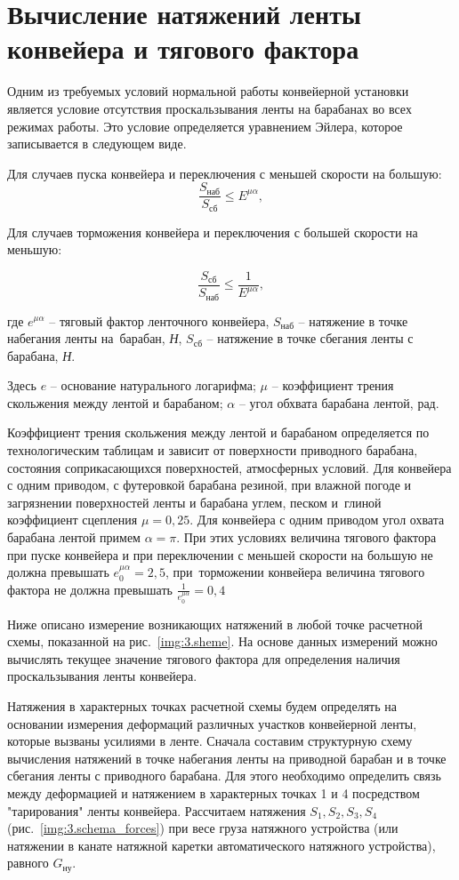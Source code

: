 \section{Вычисление натяжений ленты конвейера и тягового фактора} \label{sect3_4}
Одним из требуемых условий нормальной работы конвейерной установки является условие отсутствия проскальзывания ленты на барабанах во всех режимах работы. Это условие определяется уравнением Эйлера, которое записывается в следующем виде.

Для случаев пуска конвейера и переключения с меньшей скорости на большую:
$$ \frac{S_{\text{наб}}}{S_{\text{сб}}} \leqslant E^{\mu \alpha}, $$

Для случаев торможения конвейера и переключения с большей скорости на меньшую:

$$ \frac{S_{\text{сб}}}{S_{\text{наб}}} \leqslant \frac{1}{E^{\mu \alpha}}, $$

где $ e^{\mu \alpha} $ -- тяговый фактор ленточного конвейера, $ S_{\text{наб}} $ -- натяжение в точке набегания ленты на~барабан, \textit{Н}, $ S_{\text{сб}} $ -- натяжение в точке сбегания ленты с барабана, \textit{Н}.

Здесь $ e $ -- основание натурального логарифма;
      $ \mu $  -- коэффициент трения скольжения между лентой и барабаном;
      $ \alpha $ -- угол обхвата барабана лентой, рад.
      
Коэффициент трения скольжения между лентой и барабаном определяется по технологическим таблицам \cite{lshakhmeyster} и зависит от поверхности приводного барабана, состояния соприкасающихся поверхностей, атмосферных условий. Для конвейера с одним приводом, с футеровкой барабана резиной, при влажной погоде и загрязнении поверхностей ленты и барабана углем, песком и~глиной коэффициент сцепления $ \mu = 0,25 $. Для конвейера с одним приводом угол охвата барабана лентой примем $ \alpha = \pi $. При этих условиях величина тягового фактора при пуске конвейера и при переключении с меньшей скорости на большую не должна превышать $ e_0^{\mu \alpha} = 2,5 $, при~торможении конвейера величина тягового фактора не должна превышать $ \frac{1}{e_0^{\mu \alpha}} = 0,4 $

Ниже описано измерение возникающих натяжений в любой точке расчетной схемы, показанной на рис.~\ref{img:3.sheme}. На основе данных измерений можно вычислять текущее значение тягового фактора для определения наличия проскальзывания ленты конвейера.

Натяжения в характерных точках расчетной схемы будем определять на основании измерения деформаций различных участков конвейерной ленты, которые вызваны усилиями в ленте. Сначала составим структурную схему вычисления натяжений в точке набегания ленты на приводной барабан и в точке сбегания ленты с приводного барабана. Для этого необходимо определить связь между деформацией и натяжением в характерных точках 1 и 4 посредством "тарирования" ленты конвейера. Рассчитаем натяжения $ S_1, S_2, S_3, S_4 $ (рис.~\ref{img:3.schema_forces}) при весе груза натяжного устройства (или натяжении в канате натяжной каретки автоматического натяжного устройства), равного $ G_{\text{ну}} $.


